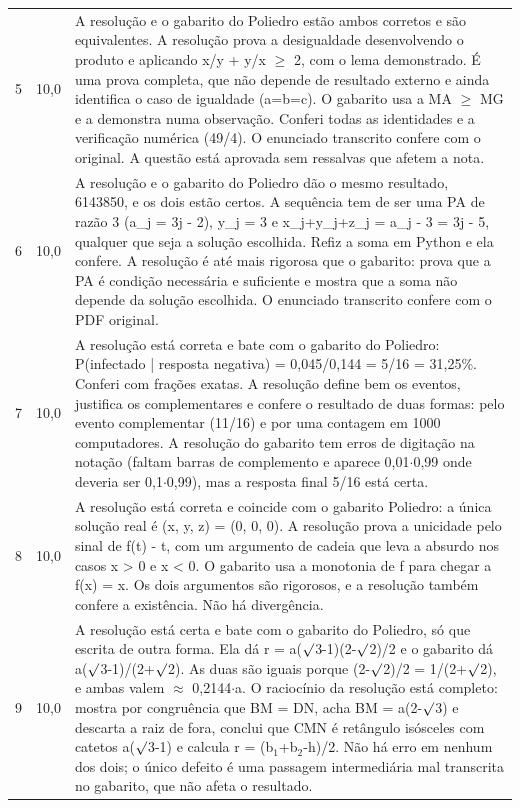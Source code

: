 \documentclass{article}%
\begin{document}
\begin{longtable}{@{}c c p{}@{}}
5 & 10,0 & A resolução e o gabarito do Poliedro estão ambos corretos e são equivalentes. A resolução prova a desigualdade desenvolvendo o produto e aplicando x/y + y/x $\geq$ 2, com o lema demonstrado. É uma prova completa, que não depende de resultado externo e ainda identifica o caso de igualdade (a=b=c). O gabarito usa a MA $\geq$ MG e a demonstra numa observação. Conferi todas as identidades e a verificação numérica (49/4). O enunciado transcrito confere com o original. A questão está aprovada sem ressalvas que afetem a nota. \\
6 & 10,0 & A resolução e o gabarito do Poliedro dão o mesmo resultado, 6143850, e os dois estão certos. A sequência tem de ser uma PA de razão 3 (a\_j = 3j - 2), y\_j = 3 e x\_j+y\_j+z\_j = a\_j - 3 = 3j - 5, qualquer que seja a solução escolhida. Refiz a soma em Python e ela confere. A resolução é até mais rigorosa que o gabarito: prova que a PA é condição necessária e suficiente e mostra que a soma não depende da solução escolhida. O enunciado transcrito confere com o PDF original. \\
7 & 10,0 & A resolução está correta e bate com o gabarito do Poliedro: P(infectado | resposta negativa) = 0,045/0,144 = 5/16 = 31,25\%. Conferi com frações exatas. A resolução define bem os eventos, justifica os complementares e confere o resultado de duas formas: pelo evento complementar (11/16) e por uma contagem em 1000 computadores. A resolução do gabarito tem erros de digitação na notação (faltam barras de complemento e aparece 0,01$\cdot$0,99 onde deveria ser 0,1$\cdot$0,99), mas a resposta final 5/16 está certa. \\
8 & 10,0 & A resolução está correta e coincide com o gabarito Poliedro: a única solução real é (x, y, z) = (0, 0, 0). A resolução prova a unicidade pelo sinal de f(t) - t, com um argumento de cadeia que leva a absurdo nos casos x > 0 e x < 0. O gabarito usa a monotonia de f para chegar a f(x) = x. Os dois argumentos são rigorosos, e a resolução também confere a existência. Não há divergência. \\
9 & 10,0 & A resolução está certa e bate com o gabarito do Poliedro, só que escrita de outra forma. Ela dá r = a($\surd$3-1)(2-$\surd$2)/2 e o gabarito dá a($\surd$3-1)/(2+$\surd$2). As duas são iguais porque (2-$\surd$2)/2 = 1/(2+$\surd$2), e ambas valem $\approx$ 0,2144$\cdot$a. O raciocínio da resolução está completo: mostra por congruência que BM = DN, acha BM = a(2-$\surd$3) e descarta a raiz de fora, conclui que CMN é retângulo isósceles com catetos a($\surd$3-1) e calcula r = (b$_{1}$+b$_{2}$-h)/2. Não há erro em nenhum dos dois; o único defeito é uma passagem intermediária mal transcrita no gabarito, que não afeta o resultado. \\

\end{longtable}
\end{document}
